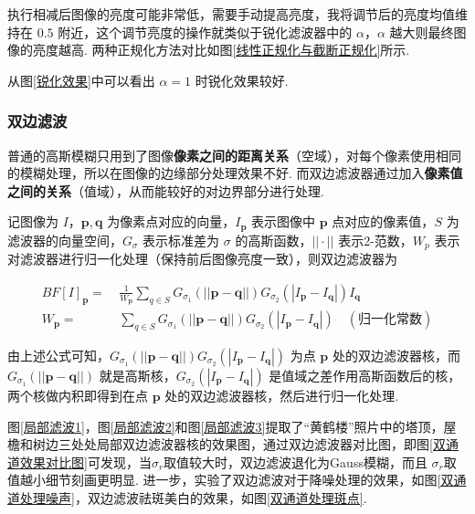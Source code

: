 \documentclass[12pt, a4paper, oneside]{ctexart}
\begin{document}
执行相减后图像的亮度可能非常低，需要手动提高亮度，我将调节后的亮度均值维持在
\(0.5\) 附近，这个调节亮度的操作就类似于锐化滤波器中的
\(\alpha\)，\(\alpha\) 越大则最终图像的亮度越高. 两种正规化方法对比如图\ref{线性正规化与截断正规化}所示.

从图\ref{锐化效果}中可以看出 \(\alpha=1\) 时锐化效果较好.

\subsubsection{双边滤波}

普通的高斯模糊只用到了图像\textbf{像素之间的距离关系}（空域），对每个像素使用相同的模糊处理，所以在图像的边缘部分处理效果不好.
而双边滤波器通过加入\textbf{像素值之间的关系}（值域），从而能较好的对边界部分进行处理.

记图像为 \(I\)，\(\boldsymbol{p},\boldsymbol{q}\)
为像素点对应的向量，\(I_{\boldsymbol{p}}\) 表示图像中 \(\boldsymbol{p}\)
点对应的像素值，\(S\) 为滤波器的向量空间，\(G_\sigma\) 表示标准差为
\(\sigma\) 的高斯函数，\(||\cdot||\) 表示2-范数，\(W_p\)
表示对滤波器进行归一化处理（保持前后图像亮度一致），则双边滤波器为

\begin{equation*}
    \begin{aligned}
        BF[I]_{\boldsymbol{p}} =&\ \frac{1}{W_{\boldsymbol{p}}}\sum_{q\in S}G_{\sigma_1}(||\boldsymbol{p}-\boldsymbol{q}||)G_{\sigma_2}(|I_{\boldsymbol{p}}-I_{\boldsymbol{q}}|)I_{\boldsymbol{q}}\\
        W_{\boldsymbol{p}}=&\ \sum_{q\in S}G_{\sigma_1}(||\boldsymbol{p}-\boldsymbol{q}||)G_{\sigma_2}(|I_{\boldsymbol{p}}-I_{\boldsymbol{q}}|)\quad(\text{归一化常数})
    \end{aligned}
\end{equation*}

由上述公式可知，\(G_{\sigma_1}(||\boldsymbol{p}-\boldsymbol{q}||)G_{\sigma_2}(|I_{\boldsymbol{p}}-I_{\boldsymbol{q}}|)\)
为点 \(\boldsymbol{p}\) 处的双边滤波器核，而
\(G_{\sigma_1}(||\boldsymbol{p}-\boldsymbol{q}||)\)
就是高斯核，\(G_{\sigma_2}(|I_{\boldsymbol{p}}-I_{\boldsymbol{q}}|)\)
是值域之差作用高斯函数后的核，两个核做内积即得到在点 \(\boldsymbol{p}\)
处的双边滤波器核，然后进行归一化处理.

图\ref{局部滤波1}，图\ref{局部滤波2}和图\ref{局部滤波3}提取了“黄鹤楼”照片中的塔顶，屋檐和树边三处处局部双边滤波器核的效果图，通过双边滤波器对比图，即图\ref{双通道效果对比图}可发现，当$\sigma_r$取值较大时，双边滤波退化为Gauss模糊，而且 $\sigma_r$取值越小细节刻画更明显. 进一步，实验了双边滤波对于降噪处理的效果，如图\ref{双通道处理噪声}，双边滤波祛斑美白的效果，如图\ref{双通道处理斑点}.
\end{document}
